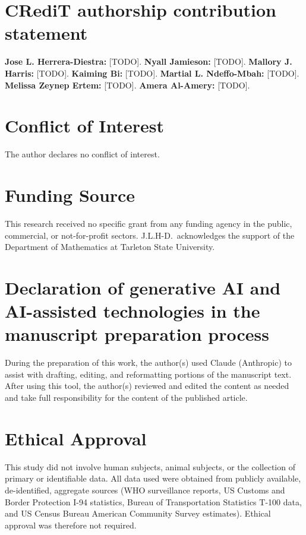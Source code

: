 \documentclass[12pt, a4paper]{article}
\begin{document}
\section*{CRediT authorship contribution statement}
\textbf{Jose L. Herrera-Diestra:} [TODO]. \textbf{Nyall Jamieson:} [TODO]. \textbf{Mallory J. Harris:} [TODO]. \textbf{Kaiming Bi:} [TODO]. \textbf{Martial L. Ndeffo-Mbah:} [TODO]. \textbf{Melissa Zeynep Ertem:} [TODO]. \textbf{Amera Al-Amery:} [TODO].

\section*{Conflict of Interest}
The author declares no conflict of interest.

\section*{Funding Source}
This research received no specific grant from any funding agency in the public, commercial, or not-for-profit sectors. J.L.H-D.\ acknowledges the support of the Department of Mathematics at Tarleton State University.

\section*{Declaration of generative AI and AI-assisted technologies in the manuscript preparation process}
During the preparation of this work, the author(s) used Claude (Anthropic) to assist with drafting, editing, and reformatting portions of the manuscript text. After using this tool, the author(s) reviewed and edited the content as needed and take full responsibility for the content of the published article.

\section*{Ethical Approval}
This study did not involve human subjects, animal subjects, or the collection of primary or identifiable data. All data used were obtained from publicly available, de-identified, aggregate sources (WHO surveillance reports, US Customs and Border Protection I-94 statistics, Bureau of Transportation Statistics T-100 data, and US Census Bureau American Community Survey estimates). Ethical approval was therefore not required.
\end{document}
